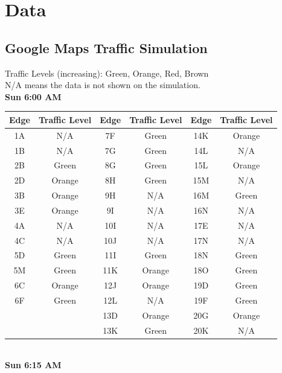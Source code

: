 \documentclass{article}
\begin{document}
\newpage
\section{Data}
\subsection{Google Maps Traffic Simulation}
Traffic Levels (increasing): Green, Orange, Red, Brown \\
N/A means the data is not shown on the simulation. \\

\textbf{Sun 6:00 AM} \\

\begin{tabular}{|c|c||c|c||c|c|}\hline
Edge & Traffic Level & Edge & Traffic Level & Edge & Traffic Level \\ \hline
1A & N/A & 7F & Green & 14K & Orange \\ 
1B & N/A & 7G & Green & 14L & N/A \\ \hline
2B & Green & 8G & Green & 15L & Orange \\ 
2D & Orange & 8H & Green & 15M & N/A \\ \hline
3B & Orange & 9H & N/A & 16M & Green \\ 
3E & Orange & 9I & N/A & 16N & N/A \\ \hline 
4A & N/A & 10I & N/A & 17E & N/A \\ 
4C & N/A & 10J & N/A & 17N & N/A \\ \hline
5D & Green & 11I & Green & 18N & Green \\ 
5M & Green & 11K & Orange & 18O & Green \\ \hline 
6C & Orange & 12J & Orange & 19D & Green \\ 
6F & Green & 12L & N/A & 19F & Green \\ \hline 
& & 13D & Orange & 20G & Orange \\
& & 13K & Green & 20K & N/A \\ \hline
\end{tabular}\\

\textbf{Sun 6:15 AM} \\
\end{document}
